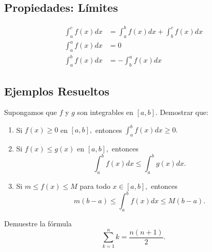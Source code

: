 	\subsection{Propiedades: Límites}
	\begin{align}
		\label{ayr:23.7}
		\int_{a}^{c}f(x)dx&=\int_{a}^{b}f(x)dx
		+\int_{b}^{c}f(x)dx\\
		\label{ayr:23.7.i}
		\int_{a}^{a}f(x)dx&=0\\
		\label{ayr:23.7.ii}
		\int_{a}^{b}f(x)dx&=-\int_{b}^{a}f(x)dx
	\end{align}



\subsection{Ejemplos Resueltos}


	\begin{resuelto}
		Supongamos que $f$ y $g$ son integrables en $[a,b].$ Demostrar que:
		\begin{enumerate}
			\item Si $f(x)\geq 0$ en $[a,b],$ entonces $\int_{a}^{b}f(x)dx\geq 0.$
			\item Si $f(x) \leq g(x)$ en $[a,b],$ entonces
			$$
			\int_{a}^{b}f(x)dx \leq \int_{a}^{b}g(x)dx.
			$$
			\item Si $m\leq f(x) \leq M$ para todo $x\in [a,b],$ entonces
			$$
			m\left( b-a \right) \leq \int_{a}^{b}f(x)dx
			\leq M\left( b-a \right).
			$$
		\end{enumerate}
	\end{resuelto}







	\begin{resuelto}
		\label{ayr:solved:23.5}
		Demuestre la fórmula
		$$
		\sum_{k=1}^{n}k=\dfrac{n\left( n+1 \right)}{2}.
		$$
	\end{resuelto}

